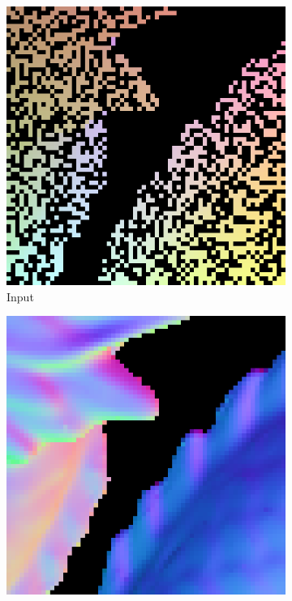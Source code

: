 \begin{figure}[th]
	\centering
	\begin{subfigure}[b]{0.15\linewidth}
		\includegraphics[width=\linewidth]{./Figures/comparison/eval_2_input.png}
		\caption{Input}
	\end{subfigure}
	\begin{subfigure}[b]{0.15\linewidth}
		\includegraphics[width=\linewidth]{./Figures/comparison/eval_2_normal_GT.png}

\end{subfigure}
\end{figure}
